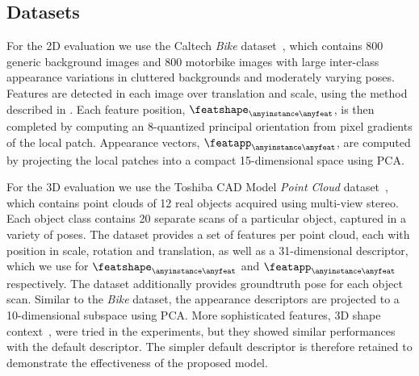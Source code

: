 \vspace{-2mm}
\subsection{Datasets}
For the 2D evaluation we use the Caltech \emph{Bike} dataset~\cite{CaltechBike2001}, which contains 800 generic background images and 800 motorbike images with large inter-class appearance variations in cluttered backgrounds and moderately varying poses. Features are detected in each image over translation and scale, using the method described in \cite{Fergus2007}. Each feature position, $\featshape_{\anyinstance\anyfeat}$, is then completed by computing an $8$-quantized principal orientation from pixel gradients of the local patch. Appearance vectors, $\featapp_{\anyinstance\anyfeat}$, are computed by projecting the local patches into a compact 15-dimensional space using PCA.  

For the 3D evaluation we use the Toshiba CAD Model \emph{Point Cloud} dataset~\cite{ToshibaCAD2011}, which contains point clouds of 12 real objects acquired using multi-view stereo. Each object class contains 20 separate scans of a particular object, captured in a variety of poses. The dataset provides a set of features per point cloud, each with position in scale, rotation and translation, as well as a 31-dimensional descriptor, which we use for $\featshape_{\anyinstance\anyfeat}$ and $\featapp_{\anyinstance\anyfeat}$ respectively. The dataset additionally provides groundtruth pose for each object scan.
Similar to the \emph{Bike} dataset, the appearance descriptors are projected to a 10-dimensional subspace using PCA. More sophisticated features, \eg 3D shape context~\cite{Frome2004}, were tried in the experiments, but they showed similar performances with the default descriptor. The simpler default descriptor is therefore retained to demonstrate the effectiveness of the proposed model.

